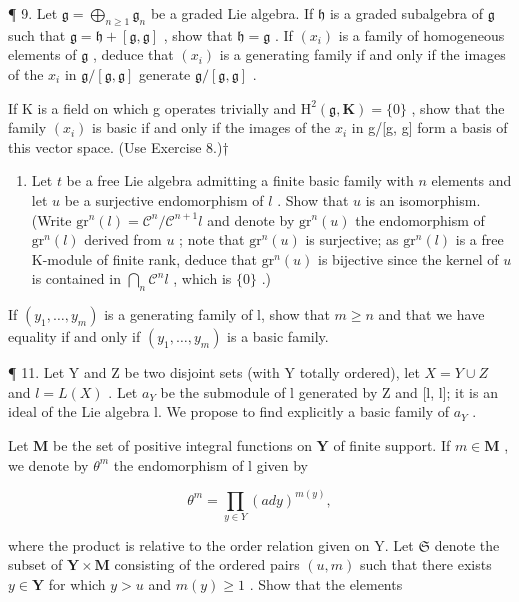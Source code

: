 ¶ 9. Let \(\mathfrak{g} = \bigoplus_{n \geqslant 1} \mathfrak{g}_n\) be a graded Lie algebra. If \(\mathfrak{h}\) is a graded subalgebra of \(\mathfrak{g}\) such that \(\mathfrak{g} = \mathfrak{h} + [\mathfrak{g}, \mathfrak{g}]\) , show that \(\mathfrak{h} = \mathfrak{g}\) . If \((x_i)\) is a family of homogeneous elements of \(\mathfrak{g}\) , deduce that \((x_i)\) is a generating family if and only if the images of the \(x_i\) in \(\mathfrak{g}/[\mathfrak{g}, \mathfrak{g}]\) generate \(\mathfrak{g}/[\mathfrak{g}, \mathfrak{g}]\) .

If K is a field on which g operates trivially and \(\mathrm{H}^{2}(\mathfrak{g},\mathbf{K})=\{0\}\) , show that the family \((x_{i})\) is basic if and only if the images of the \(x_{i}\) in g/{[}g, g{]} form a basis of this vector space. (Use Exercise 8.)†

\begin{enumerate}
\def\labelenumi{\arabic{enumi}.}
\setcounter{enumi}{9}
\tightlist
\item
  Let \(t\) be a free Lie algebra admitting a finite basic family with \(n\) elements and let \(u\) be a surjective endomorphism of \(l\) . Show that \(u\) is an isomorphism. (Write \(\mathrm{gr}^n(l) = \mathcal{C}^n / \mathcal{C}^{n+1}l\) and denote by \(\mathrm{gr}^n(u)\) the endomorphism of \(\mathrm{gr}^n(l)\) derived from \(u\) ; note that \(\mathrm{gr}^n(u)\) is surjective; as \(\mathrm{gr}^n(l)\) is a free K-module of finite rank, deduce that \(\mathrm{gr}^n(u)\) is bijective since the kernel of \(u\) is contained in \(\bigcap_{n} \mathcal{C}^n l\) , which is \(\{0\}\) .)
\end{enumerate}

If \((y_{1},\ldots ,y_{m})\) is a generating family of l, show that \(m\geqslant n\) and that we have equality if and only if \((y_{1},\ldots ,y_{m})\) is a basic family.

¶ 11. Let Y and Z be two disjoint sets (with Y totally ordered), let \(X = Y \cup Z\) and \(l = L(X)\) . Let \(a_{Y}\) be the submodule of l generated by Z and {[}l, l{]}; it is an ideal of the Lie algebra l. We propose to find explicitly a basic family of \(a_{Y}\) .

Let \(\mathbf{M}\) be the set of positive integral functions on \(\mathbf{Y}\) of finite support. If \(m\in \mathbf{M}\) , we denote by \(\theta^m\) the endomorphism of l given by

\[
\theta^ {m} = \prod_ {y \in Y} (a d y) ^ {m (y)},
\]

where the product is relative to the order relation given on Y. Let \(\mathfrak{S}\) denote the subset of \(\mathbf{Y} \times \mathbf{M}\) consisting of the ordered pairs \((u, m)\) such that there exists \(y \in \mathbf{Y}\) for which \(y > u\) and \(m(y) \geqslant 1\) . Show that the elements

